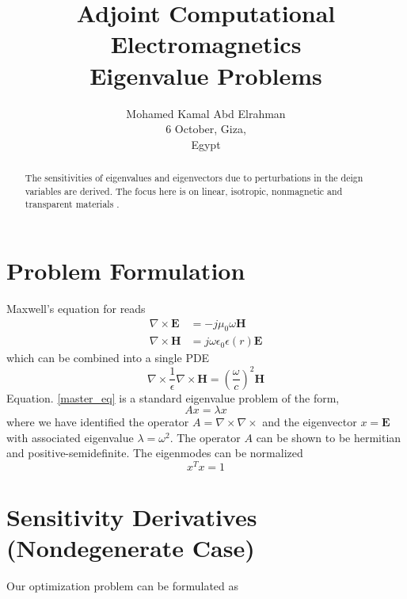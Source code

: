 \documentclass{tufte-handout}
\title{ Adjoint Computational Electromagnetics \\ 
Eigenvalue Problems	}
\author[mohamedkamal]{Mohamed Kamal Abd Elrahman \\
6 October, Giza,\\ Egypt}
\begin{document}
	\maketitle

\begin{abstract}
	The sensitivities of eigenvalues and eigenvectors due to perturbations in the deign variables are derived. The focus here is on linear, isotropic, nonmagnetic and transparent materials . 
\end{abstract}
 \section{Problem Formulation}
Maxwell's equation for  reads 
\begin{subequations}
	\begin{align}
	\nabla \times \mathbf{E}  &= -j \mu_0  \omega \mathbf{H}\\
	\nabla \times \mathbf{H}  &=   j \omega \epsilon_0 \epsilon(r) \mathbf{E}
	\end{align}
\end{subequations}
which can be combined into a single PDE  
\begin{equation}\label{master_eq}
\nabla \times \frac{1}{\epsilon} \nabla \times \mathbf{H}   = \left(  \frac{\omega}{c}\right)^2 \mathbf{H}
\end{equation}
Equation. \ref{master_eq} is a standard eigenvalue problem of the form,
\begin{equation}\label{ev}
A x = \lambda x
\end{equation}
where we have identified the operator $A = \nabla \times \nabla \times  $ and the eigenvector  $x = \mathbf{E}$ with associated eigenvalue $\lambda = \omega^2$. The operator $A$  can be shown to be hermitian and positive-semidefinite. The eigenmodes can be normalized
\begin{equation}
x^T x = 1
\end{equation}
\section{Sensitivity Derivatives (Nondegenerate Case)}
Our optimization problem can  be formulated as
\end{document}
